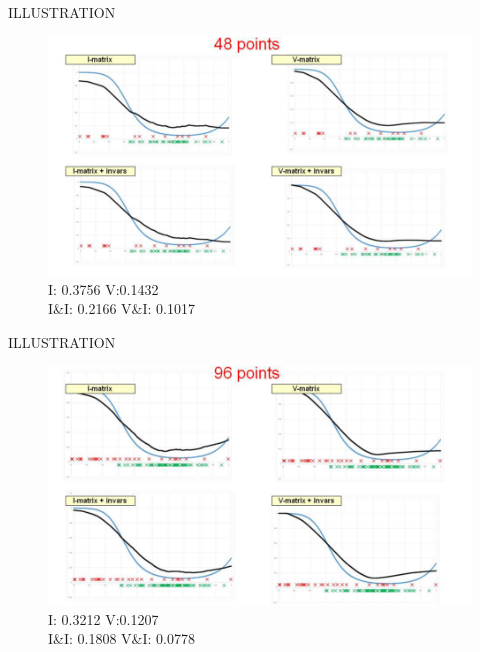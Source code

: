 \documentclass[11pt]{beamer}
\begin{document}
\begin{frame}{ILLUSTRATION}
\begin{figure}
\includegraphics[width=1\linewidth]{Imgs/lusi-fig1.png}
I: 0.3756 \quad V:0.1432\\
I\&I: 0.2166 \quad V\&I: 0.1017
\end{figure}
\end{frame}

\begin{frame}{ILLUSTRATION}
\begin{figure}
\includegraphics[width=1\linewidth]{Imgs/lusi-fig2.png}
I: 0.3212 \quad V:0.1207\\
I\&I: 0.1808 \quad V\&I: 0.0778
\end{figure}
\end{frame}
\end{document}
